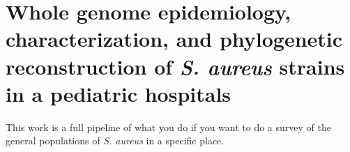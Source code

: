 \section{Whole genome epidemiology, characterization, and phylogenetic reconstruction of \emph{S. aureus} strains in a pediatric hospitals}

This work is a full pipeline of what you do if you want to do a survey of the general populations of \emph{S. aureus} in a specific place. 
